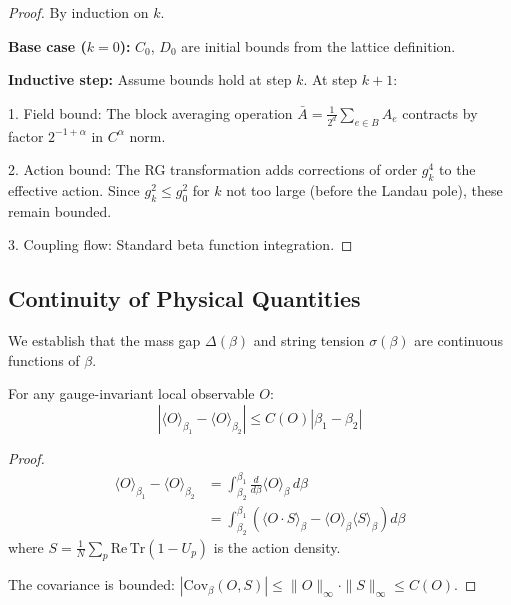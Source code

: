 \begin{proof}
By induction on $k$.

\textbf{Base case ($k=0$):}
$C_0$, $D_0$ are initial bounds from the lattice definition.

\textbf{Inductive step:}
Assume bounds hold at step $k$. At step $k+1$:

1. Field bound: The block averaging operation $\bar{A} = \frac{1}{2^d}\sum_{e \in B} A_e$ contracts by factor $2^{-1+\alpha}$ in $C^\alpha$ norm.

2. Action bound: The RG transformation adds corrections of order $g_k^4$ to the effective action. Since $g_k^2 \leq g_0^2$ for $k$ not too large (before the Landau pole), these remain bounded.

3. Coupling flow: Standard beta function integration.
\end{proof}


\subsection{Continuity of Physical Quantities}
\label{subsec:continuity}

We establish that the mass gap $\Delta(\beta)$ and string tension $\sigma(\beta)$ are continuous functions of $\beta$.

\begin{theorem}
\label{thm:lipschitz_correlation}
For any gauge-invariant local observable $O$:
\begin{equation}
|\langle O \rangle_{\beta_1} - \langle O \rangle_{\beta_2}| \leq C(O) |\beta_1 - \beta_2|
\end{equation}
\end{theorem}

\begin{proof}
\begin{align}
\langle O \rangle_{\beta_1} - \langle O \rangle_{\beta_2} &= \int_{\beta_2}^{\beta_1} \frac{d}{d\beta} \langle O \rangle_\beta \, d\beta \\
&= \int_{\beta_2}^{\beta_1} \left(\langle O \cdot S \rangle_\beta - \langle O \rangle_\beta \langle S \rangle_\beta\right) d\beta
\end{align}
where $S = \frac{1}{N}\sum_p \mathrm{Re}\,\mathrm{Tr}(1 - U_p)$ is the action density.

The covariance is bounded: $|\mathrm{Cov}_\beta(O, S)| \leq \|O\|_\infty \cdot \|S\|_\infty \leq C(O)$.
\end{proof}

